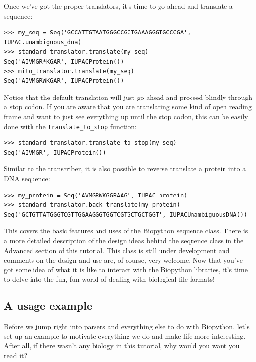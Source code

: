 \documentclass{article}
\begin{document}
Once we've got the proper translators, it's time to go ahead and translate a sequence:

\begin{verbatim}
>>> my_seq = Seq('GCCATTGTAATGGGCCGCTGAAAGGGTGCCCGA', IUPAC.unambiguous_dna)
>>> standard_translator.translate(my_seq)
Seq('AIVMGR*KGAR', IUPACProtein())
>>> mito_translator.translate(my_seq)
Seq('AIVMGRWKGAR', IUPACProtein())
\end{verbatim}

Notice that the default translation will just go ahead and proceed blindly through a stop codon. If you are aware that you are translating some kind of open reading frame and want to just see everything up until the stop codon, this can be easily done with the \verb|translate_to_stop| function:

\begin{verbatim}
>>> standard_translator.translate_to_stop(my_seq)
Seq('AIVMGR', IUPACProtein())
\end{verbatim}

Similar to the transcriber, it is also possible to reverse translate a protein into a DNA sequence:

\begin{verbatim}
>>> my_protein = Seq('AVMGRWKGGRAAG', IUPAC.protein)
>>> standard_translator.back_translate(my_protein)
Seq('GCTGTTATGGGTCGTTGGAAGGGTGGTCGTGCTGCTGGT', IUPACUnambiguousDNA())
\end{verbatim}

This covers the basic features and uses of the Biopython sequence class. There is a more detailed description of the design ideas behind the sequence class in the Advanced section of this tutorial. This class is still under development and comments on the design and use are, of course, very welcome. Now that you've got some idea of what it is like to interact with the Biopython libraries, it's time to delve into the fun, fun world of dealing with biological file formats!

\subsection{A usage example}

Before we jump right into parsers and everything else to do with Biopython, let's set up an example to motivate everything we do and make life more interesting. After all, if there wasn't any biology in this tutorial, why would you want you read it?
\end{document}
